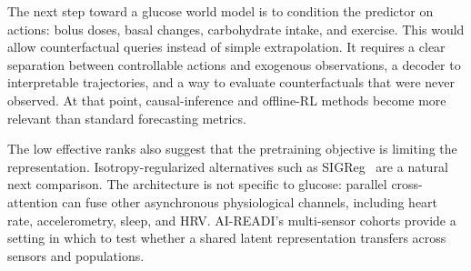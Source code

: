 \documentclass[11pt,a4paper]{article}
\begin{document}
The next step toward a glucose world model is to condition the predictor on actions: bolus doses, basal changes, carbohydrate intake, and exercise.
This would allow counterfactual queries instead of simple extrapolation.
It requires a clear separation between controllable actions and exogenous observations, a decoder to interpretable trajectories, and a way to evaluate counterfactuals that were never observed.
At that point, causal-inference and offline-RL methods become more relevant than standard forecasting metrics.

The low effective ranks also suggest that the pretraining objective is limiting the representation.
Isotropy-regularized alternatives such as SIGReg~\citep{balestriero2025lejepa} are a natural next comparison.
The architecture is not specific to glucose: parallel cross-attention can fuse other asynchronous physiological channels, including heart rate, accelerometry, sleep, and HRV.
AI-READI's multi-sensor cohorts provide a setting in which to test whether a shared latent representation transfers across sensors and populations.
\end{document}
